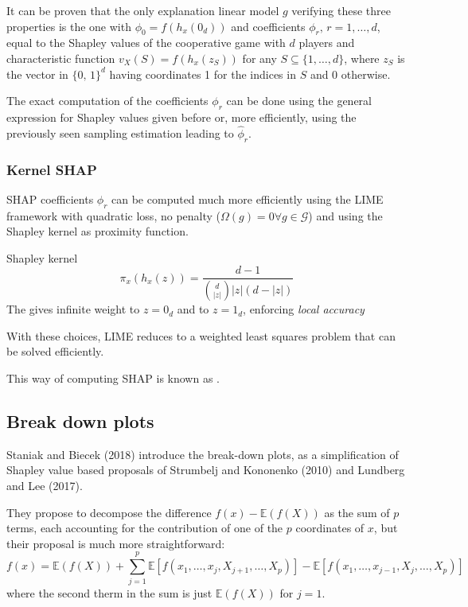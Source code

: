It can be proven that the only explanation linear model $g$ verifying these three
properties is the one with $\phi_0 = f(h_x(0_d))$ and coefficients $\phi_r,\, r=1,\ldots,d$, equal to
the Shapley values of the cooperative game with $d$ players and characteristic function
$v_X(S) = f(h_x(z_S))$ for any $S \subseteq \{1,\ldots,d\}$,
where $z_S$ is the vector in $\{0,\,1\}^d$ having coordinates 1 for the indices in $S$ and 0 otherwise.

The exact computation of the coefficients $\phi_r$ can be done using the general expression for
Shapley values given before or, more efficiently,
using the previously seen sampling estimation leading to $\hat \phi_r$.

\subsubsection{Kernel SHAP}

SHAP coefficients $\phi_r$ can be computed much more efficiently using the LIME
framework with quadratic loss, no penalty ($\Omega(g) = 0 \forall g \in \mathcal G$) and
using the Shapley kernel as proximity function.

\begin{definition}{Shapley kernel}{}
	\begin{equation*}
		\pi_x (h_x(z)) = \frac{d - 1}{\binom{d}{|z|}|z|(d - |z|)}
	\end{equation*}
	\tcblower
	The  gives infinite weight to $z = 0_d$ and to $z = 1_d$,
	enforcing \emph{local accuracy}
\end{definition}

With these choices, LIME reduces to a weighted least squares problem that can be solved efficiently.

This way of computing SHAP is known as .


\subsection{Break down plots}

Staniak and Biecek (2018) introduce the break-down plots, as a
simplification of Shapley value based proposals of Strumbelj and
Kononenko (2010) and Lundberg and Lee (2017).

They propose to decompose the difference $f(x) − \mathds E(f (X))$ as the
sum of $p$ terms, each accounting for the contribution of one of the $p$
coordinates of $x$, but their proposal is much more straightforward:
\begin{equation*}
	f(x) = \mathds E(f(X)) + \sum_{j = 1}^p \mathds E \left[
	f(x_1,\ldots,x_j,X_{j+1},\ldots,X_p)
	\right] - \mathds E \left[
	f(x_1,\ldots,x_{j-1},X_{j},\ldots,X_p)
	\right]
\end{equation*}
where the second therm in the sum is just $\mathds E(f(X))$ for $j=1$.


